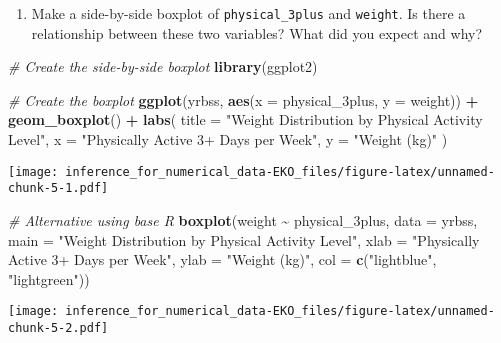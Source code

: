 \documentclass[
]{article}
\newenvironment{Shaded}{\begin{snugshade}}{\end{snugshade}}
\newcommand{\AttributeTok}[1]{\textcolor[rgb]{0.13,0.29,0.53}{#1}}
\newcommand{\CommentTok}[1]{\textcolor[rgb]{0.56,0.35,0.01}{\textit{#1}}}
\newcommand{\FunctionTok}[1]{\textcolor[rgb]{0.13,0.29,0.53}{\textbf{#1}}}
\newcommand{\NormalTok}[1]{#1}
\newcommand{\SpecialCharTok}[1]{\textcolor[rgb]{0.81,0.36,0.00}{\textbf{#1}}}
\newcommand{\StringTok}[1]{\textcolor[rgb]{0.31,0.60,0.02}{#1}}
\providecommand{\tightlist}{%
  \setlength{\itemsep}{0pt}\setlength{\parskip}{0pt}}
\begin{document}
\begin{enumerate}
\def\labelenumi{\arabic{enumi}.}
\setcounter{enumi}{2}
\tightlist
\item
  Make a side-by-side boxplot of \texttt{physical\_3plus} and
  \texttt{weight}. Is there a relationship between these two variables?
  What did you expect and why?
\end{enumerate}

\begin{Shaded}
\begin{Highlighting}[]
\CommentTok{\# Create the side{-}by{-}side boxplot}
\FunctionTok{library}\NormalTok{(ggplot2)}

\CommentTok{\# Create the boxplot}
\FunctionTok{ggplot}\NormalTok{(yrbss, }\FunctionTok{aes}\NormalTok{(}\AttributeTok{x =}\NormalTok{ physical\_3plus, }\AttributeTok{y =}\NormalTok{ weight)) }\SpecialCharTok{+}
  \FunctionTok{geom\_boxplot}\NormalTok{() }\SpecialCharTok{+}
  \FunctionTok{labs}\NormalTok{(}
    \AttributeTok{title =} \StringTok{"Weight Distribution by Physical Activity Level"}\NormalTok{,}
    \AttributeTok{x =} \StringTok{"Physically Active 3+ Days per Week"}\NormalTok{,}
    \AttributeTok{y =} \StringTok{"Weight (kg)"}
\NormalTok{  )}
\end{Highlighting}
\end{Shaded}

\texttt{[image: inference\_for\_numerical\_data-EKO\_files/figure-latex/unnamed-chunk-5-1.pdf]}

\begin{Shaded}
\begin{Highlighting}[]
\CommentTok{\# Alternative using base R}
\FunctionTok{boxplot}\NormalTok{(weight }\SpecialCharTok{\textasciitilde{}}\NormalTok{ physical\_3plus, }\AttributeTok{data =}\NormalTok{ yrbss,}
        \AttributeTok{main =} \StringTok{"Weight Distribution by Physical Activity Level"}\NormalTok{,}
        \AttributeTok{xlab =} \StringTok{"Physically Active 3+ Days per Week"}\NormalTok{,}
        \AttributeTok{ylab =} \StringTok{"Weight (kg)"}\NormalTok{,}
        \AttributeTok{col =} \FunctionTok{c}\NormalTok{(}\StringTok{"lightblue"}\NormalTok{, }\StringTok{"lightgreen"}\NormalTok{))}
\end{Highlighting}
\end{Shaded}

\texttt{[image: inference\_for\_numerical\_data-EKO\_files/figure-latex/unnamed-chunk-5-2.pdf]}
\end{document}
